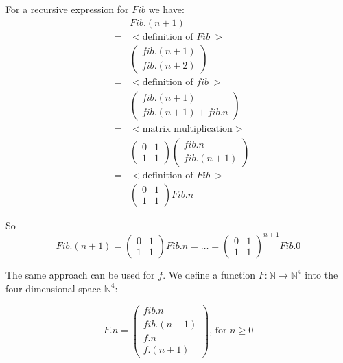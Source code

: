 For a recursive expression for $\mathit{Fib}$ we have:
\[
\begin{array}{lcl}
  &&\mathit{Fib}.(n + 1) \\
   &=& { < \text{definition of  } \mathit{Fib}\ >} \\ 
  &&\begin{pmatrix}
       \mathit{fib}.(n + 1) \\
       \mathit{fib}.(n + 2)
   \end{pmatrix} \\
   &=& { < \text{definition of  } \mathit{fib}\ >} \\ 
   &&\begin{pmatrix}
       \mathit{fib}.(n + 1) \\
       \mathit{fib}.(n + 1) + \mathit{fib}.n
   \end{pmatrix} \\
   &=& { < \text{matrix multiplication}  >} \\ 
   &&\begin{pmatrix}
       0 & 1 \\
       1 & 1
   \end{pmatrix} 
   \begin{pmatrix}
        \mathit{fib}.n \\
       \mathit{fib}.(n + 1)
   \end{pmatrix} \\
   &=& { < \text{definition of  } \mathit{Fib}\ >} \\ 
   &&\begin{pmatrix}
       0 & 1 \\
       1 & 1
   \end{pmatrix} \mathit{Fib}.n
  \end{array}
\]

So 
\[
  \mathit{Fib}.(n + 1) = 
  \begin{pmatrix}
       0 & 1 \\
       1 & 1
   \end{pmatrix}   \mathit{Fib}.n = \ldots = 
   \begin{pmatrix}
       0 & 1 \\
       1 & 1
   \end{pmatrix} ^{n + 1}  \mathit{Fib}.0
\]

The same approach can be used for $f$. We define a function $F: \mathbb{N}  \rightarrow \mathbb{N}^4$ into the four-dimensional space $\mathbb{N}^4$:

\[
  F.n = 
  \begin{pmatrix}
       \mathit{fib}.n \\
       \mathit{fib}.(n + 1) \\
       f.n \\
       f.(n + 1)
   \end{pmatrix}   \text{, for } n \geq 0 
\]

